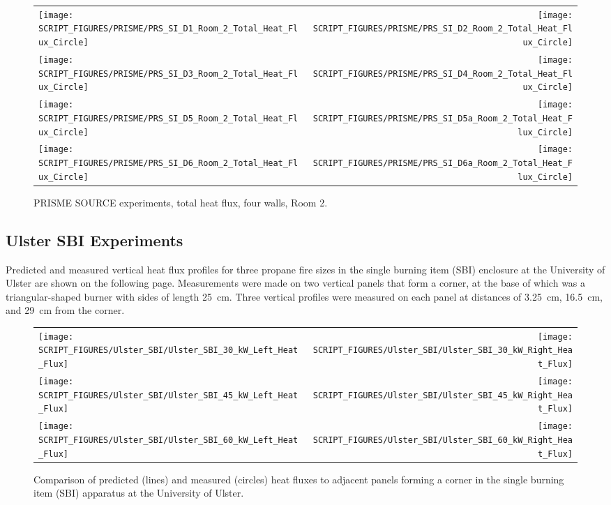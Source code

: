 \begin{figure}[p]
\begin{tabular*}{\textwidth}{l@{\extracolsep{\fill}}r}
\texttt{[image: SCRIPT\_FIGURES/PRISME/PRS\_SI\_D1\_Room\_2\_Total\_Heat\_Flux\_Circle]} &
\texttt{[image: SCRIPT\_FIGURES/PRISME/PRS\_SI\_D2\_Room\_2\_Total\_Heat\_Flux\_Circle]} \\
\texttt{[image: SCRIPT\_FIGURES/PRISME/PRS\_SI\_D3\_Room\_2\_Total\_Heat\_Flux\_Circle]} &
\texttt{[image: SCRIPT\_FIGURES/PRISME/PRS\_SI\_D4\_Room\_2\_Total\_Heat\_Flux\_Circle]} \\
\texttt{[image: SCRIPT\_FIGURES/PRISME/PRS\_SI\_D5\_Room\_2\_Total\_Heat\_Flux\_Circle]} &
\texttt{[image: SCRIPT\_FIGURES/PRISME/PRS\_SI\_D5a\_Room\_2\_Total\_Heat\_Flux\_Circle]} \\
\texttt{[image: SCRIPT\_FIGURES/PRISME/PRS\_SI\_D6\_Room\_2\_Total\_Heat\_Flux\_Circle]} &
\texttt{[image: SCRIPT\_FIGURES/PRISME/PRS\_SI\_D6a\_Room\_2\_Total\_Heat\_Flux\_Circle]}
\end{tabular*}
\caption{PRISME SOURCE experiments, total heat flux, four walls, Room 2.}
\label{PRISME_SOURCE_Wall_Circle_THF_Room_2}
\end{figure}

\clearpage


\subsection{Ulster SBI Experiments}

Predicted and measured vertical heat flux profiles for three propane fire sizes in the single burning item (SBI) enclosure at the University of Ulster are shown on the following page. Measurements were made on two vertical panels that form a corner, at the base of which was a triangular-shaped burner with sides of length 25~cm. Three vertical profiles were measured on each panel at distances of 3.25~cm, 16.5~cm, and 29~cm from the corner.

\begin{figure}[h!]
\begin{tabular*}{\textwidth}{l@{\extracolsep{\fill}}r}
\texttt{[image: SCRIPT\_FIGURES/Ulster\_SBI/Ulster\_SBI\_30\_kW\_Left\_Heat\_Flux]} &
\texttt{[image: SCRIPT\_FIGURES/Ulster\_SBI/Ulster\_SBI\_30\_kW\_Right\_Heat\_Flux]} \\
\texttt{[image: SCRIPT\_FIGURES/Ulster\_SBI/Ulster\_SBI\_45\_kW\_Left\_Heat\_Flux]} &
\texttt{[image: SCRIPT\_FIGURES/Ulster\_SBI/Ulster\_SBI\_45\_kW\_Right\_Heat\_Flux]} \\
\texttt{[image: SCRIPT\_FIGURES/Ulster\_SBI/Ulster\_SBI\_60\_kW\_Left\_Heat\_Flux]} &
\texttt{[image: SCRIPT\_FIGURES/Ulster\_SBI/Ulster\_SBI\_60\_kW\_Right\_Heat\_Flux]}
\end{tabular*}
\label{Ulster_SBI}
\caption[Ulster SBI experiments, corner fire heat flux]
{Comparison of predicted (lines) and measured (circles) heat fluxes to adjacent panels forming a corner in the single
burning item (SBI) apparatus at the University of Ulster.}
\end{figure}


